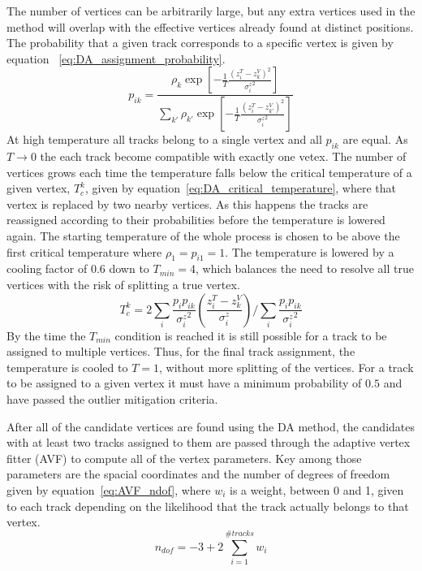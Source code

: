 The number of vertices can be arbitrarily large, but any extra vertices used in the method will overlap with the effective vertices already found at distinct positions.
The probability that a given track corresponds to a specific vertex is given by equation ~\ref{eq:DA_assignment_probability}.
\begin{equation}
	\label{eq:DA_assignment_probability}
	p_{ik}=\frac{\rho_{k}\exp\left[-\frac{1}{T}\frac{\left(z_{i}^{T}-z_{k}^{V}\right)^{2}}{{\sigma_{i}^{z}}^{2}}\right]}{\sum_{k'}\rho_{k'}\exp\left[-\frac{1}{T}\frac{\left(z_{i}^{T}-z_{k'}^{V}\right)^{2}}{{\sigma_{i}^{z}}^{2}}\right]}
\end{equation} 
At high temperature all tracks belong to a single vertex and all $p_{ik}$ are equal.
As $T\rightarrow0$ the each track become compatible with exactly one vetex.
The number of vertices grows each time the temperature falls below the critical temperature of a given vertex, $T_{c}^{k}$, given by equation~\ref{eq:DA_critical_temperature}, where that vertex is replaced by two nearby vertices.
As this happens the tracks are reassigned according to their probabilities before the temperature is lowered again.
The starting temperature of the whole process is chosen to be above the first critical temperature where $\rho_{1}=p_{i1}=1$.
The temperature is lowered by a cooling factor of 0.6 down to $T_{min}=4$, which balances the need to resolve all true vertices with the risk of splitting a true vertex.
\begin{equation}
	\label{eq:DA_critical_temperature}
	T_{c}^{k}=2\sum_{i}\frac{p_{i}p_{ik}}{{\sigma_{i}^{z}}^{2}}\left(\frac{z_{i}^{T}-z_{k}^{V}}{\sigma_{i}^{z}}\right)/\sum_{i}\frac{p_{i}p_{ik}}{{\sigma_{i}^{z}}^{2}}
\end{equation}
By the time the $T_{min}$ condition is reached it is still possible for a track to be assigned to multiple vertices.
Thus, for the final track assignment, the temperature is cooled to $T=1$, without more splitting of the vertices.
For a track to be assigned to a given vertex it must have a minimum probability of $0.5$ and have passed the outlier mitigation criteria.

After all of the candidate vertices are found using the DA method, the candidates with at least two tracks assigned to them are passed through the adaptive vertex fitter (AVF) to compute all of the vertex parameters.
Key among those parameters are the spacial coordinates and the number of degrees of freedom given by equation~\ref{eq:AVF_ndof}, where $w_{i}$ is a weight, between 0 and 1, given to each track depending on the likelihood that the track actually belongs to that vertex.
\begin{equation}
	\label{eq:AVF_ndof}
	n_{dof}=-3+2\sum_{i=1}^{\#tracks}w_{i}
\end{equation}

